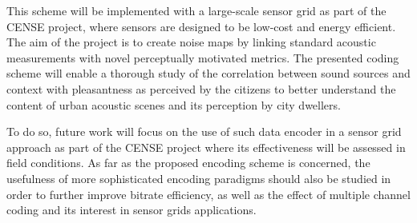 \documentclass[sensors,article,accept,moreauthors,pdftex,10pt,a4paper]{mdpi}
\begin{document}
This scheme will be implemented with a large-scale sensor grid as part of the CENSE project, where sensors are designed to be low-cost and energy efficient. The aim of the project is to create noise maps by linking standard acoustic measurements with novel perceptually motivated metrics. The presented coding scheme will enable a thorough study of the correlation between sound sources and context with pleasantness as perceived by the citizens to better understand the content of urban acoustic scenes and its perception by city dwellers.

To do so, future work will focus on the use of such data encoder in a sensor grid approach as part of the CENSE project where its effectiveness will be assessed in field conditions. As far as the proposed encoding scheme is concerned, the usefulness of more sophisticated encoding paradigms should also be studied in order to further improve bitrate efficiency, as well as the effect of multiple channel coding and its interest in sensor grids applications.

\vspace{6pt} 

\end{document}
